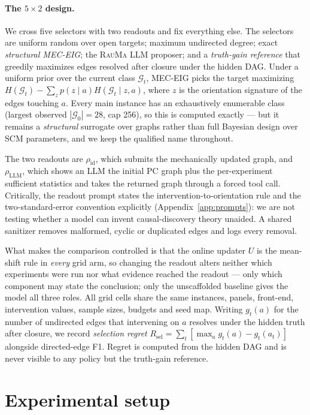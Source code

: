 \documentclass{article}
\newcommand{\rauma}{\textsc{RauMa}}
\begin{document}
\paragraph{The $5\times2$ design.}
\label{sec:design}
We cross five selectors with two readouts and fix everything else. The selectors are uniform
random over open targets; maximum undirected degree; exact \emph{structural MEC-EIG}; the
\rauma{} LLM proposer; and a \emph{truth-gain reference} that greedily maximizes edges resolved
after closure under the hidden DAG. Under a uniform prior over the current class $\mathcal{G}_t$,
MEC-EIG picks the target maximizing $H(\mathcal{G}_t) - \sum_z p(z \mid a) H(\mathcal{G}_t \mid
z, a)$, where $z$ is the orientation signature of the edges touching $a$. Every main instance has
an exhaustively enumerable class (largest observed $|\mathcal{G}_0|=28$, cap 256), so this is
computed exactly --- but it remains a \emph{structural} surrogate over graphs rather than full
Bayesian design over SCM parameters, and we keep the qualified name throughout.

The two readouts are $\rho_{\mathrm{id}}$, which submits the mechanically updated graph, and
$\rho_{\mathrm{LLM}}$, which shows an LLM the initial PC graph plus the per-experiment sufficient
statistics and takes the returned graph through a forced tool call. Critically, the readout
prompt states the intervention-to-orientation rule and the two-standard-error convention
explicitly (Appendix~\ref{app:prompts}): we are not testing whether a model can invent
causal-discovery theory unaided. A shared sanitizer removes malformed, cyclic or duplicated edges
and logs every removal.

What makes the comparison controlled is that the online updater $U$ is the mean-shift rule in
\emph{every} grid arm, so changing the readout alters neither which experiments were run nor
what evidence reached the readout --- only which component may state the conclusion; only the
unscaffolded baseline gives the model all three roles. All grid cells share the same instances,
panels, front-end, intervention values, sample sizes, budgets and seed map. Writing $g_t(a)$
for the number of undirected edges that intervening on $a$ resolves under the hidden truth
after closure, we record \emph{selection regret} $R_{\mathrm{sel}} = \sum_t [\max_a g_t(a) -
g_t(a_t)]$ alongside directed-edge F1. Regret is computed from the hidden DAG and is never
visible to any policy but the truth-gain reference.

\section{Experimental setup}
\label{sec:setup}
\end{document}
